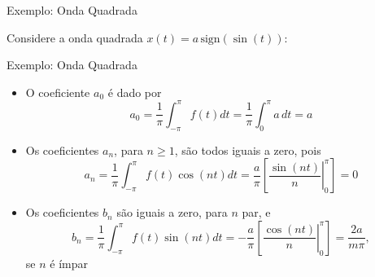 \begin{frame}[fragile]{Exemplo: Onda Quadrada}

    Considere a onda quadrada $x(t) = a\,\mathrm{sign}(\sin(t))$:

    \begin{figure}
        \centering

    \end{figure}

\end{frame}

\begin{frame}[fragile]{Exemplo: Onda Quadrada}

    \begin{itemize}
        \item O coeficiente $a_0$ é dado por
        \[
            a_0 = \frac{1}{\pi}\int_{-\pi}^{\pi} f(t)dt = \frac{1}{\pi}\int_{0}^{\pi} a\, dt = a
        \]

        \item Os coeficientes $a_n$, para $n\geq 1$, são todos iguais a zero, pois
        \[
            a_n = \frac{1}{\pi}\int_{-\pi}^{\pi} f(t)\cos(nt) dt 
                = \frac{a}{\pi}\left[\left.\frac{\sin(nt)}{n}\right\rvert_0^\pi\right] = 0
        \]

        \item Os coeficientes $b_n$ são iguais a zero, para $n$ par, e
        \[
            b_n = \frac{1}{\pi}\int_{-\pi}^{\pi} f(t)\sin(nt) dt 
                = -\frac{a}{\pi}\left[\left.\frac{\cos(nt)}{n}\right\rvert_0^\pi\right] = \frac{2a}{m\pi},
        \]
        se $n$ é ímpar
    \end{itemize}

\end{frame}

